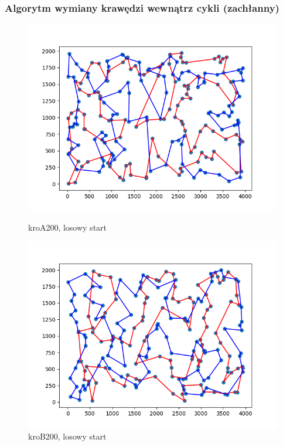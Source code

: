 \documentclass[11pt]{article}
\begin{document}
\subsubsection{Algorytm wymiany krawędzi wewnątrz cykli (zachłanny)}
\begin{figure}[H]
    \centering
    \begin{minipage}[t]{0.45\textwidth}
        \centering
        \includegraphics[width=\linewidth]{best_paths/kroA200/traverse_greedy/randomstart.png}
        \caption{kroA200, losowy start}
    \end{minipage}
    \hfill
    \begin{minipage}[t]{0.45\textwidth}
        \centering
        \includegraphics[width=\linewidth]{best_paths/kroB200/traverse_greedy/randomstart.png}
        \caption{kroB200, losowy start}
    \end{minipage}


\end{figure}
\end{document}
